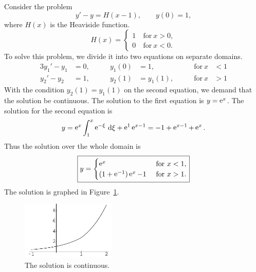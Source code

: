 \begin{Example}
  Consider the problem
  \[ 
  y' - y = H(x-1), \qquad y(0) = 1,
  \]
  where $H(x)$ is the Heaviside function.
  \[ H(x) = 
  \begin{cases}
    1\ &\mathrm{for}\ x > 0, \\
    0\ &\mathrm{for}\ x < 0.
  \end{cases}
  \]
  To solve this problem, we divide it into two equations on separate domains.
  \begin{alignat*}{3}
    y_1' - y_1 &= 0, &\qquad y_1(0) &= 1, &\qquad \mathrm{for}\ x &< 1 \\
    y_2' - y_2 &= 1, &\qquad y_2(1) &= y_1(1), &\qquad \mathrm{for}\ x &> 1
  \end{alignat*}
  With the condition $y_2(1) = y_1(1)$ on the second equation, we demand that
  the solution be continuous.  The solution to the first equation is 
  $y = \mathop{\mathrm{e}}\nolimits^x$.  The solution for the second equation is
  \[
  y = \mathop{\mathrm{e}}\nolimits^x \int_1^x \mathop{\mathrm{e}}\nolimits^{-\xi}\,\mathrm{d} \xi + \mathop{\mathrm{e}}\nolimits^1 \mathop{\mathrm{e}}\nolimits^{x-1} = -1 + \mathop{\mathrm{e}}\nolimits^{x-1} + \mathop{\mathrm{e}}\nolimits^x.
  \]
  Thus the solution over the whole domain is
  \[ 
  \boxed{
    y = 
    \begin{cases}
      \mathop{\mathrm{e}}\nolimits^x \ &\mathrm{for}\ x < 1,  \\
      (1+\mathop{\mathrm{e}}\nolimits^{-1})\mathop{\mathrm{e}}\nolimits^x-1 \ &\mathrm{for}\ x > 1.
    \end{cases}
    }
  \]
  The solution is graphed in Figure~\ref{heaviside}.

  \begin{figure}[tb!]
    \begin{center}
      \includegraphics[width=0.4\textwidth]{ode/first_order/heavi}
    \end{center}
    \caption{The solution is continuous.}
    \label{heaviside}
  \end{figure}

\end{Example}
















